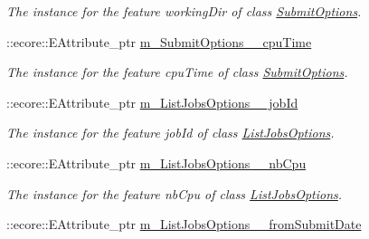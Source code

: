 \begin{DoxyCompactItemize}
\begin{DoxyCompactList}\small\item\em The instance for the feature workingDir of class \hyperlink{classTMS__Data_1_1SubmitOptions}{SubmitOptions}. \item\end{DoxyCompactList}\item 
\hypertarget{classTMS__Data_1_1TMS__DataPackage_a0ea9652678dbff3091b737de719a0cf8}{
::ecore::EAttribute\_\-ptr \hyperlink{classTMS__Data_1_1TMS__DataPackage_a0ea9652678dbff3091b737de719a0cf8}{m\_\-SubmitOptions\_\-\_\-cpuTime}}
\label{classTMS__Data_1_1TMS__DataPackage_a0ea9652678dbff3091b737de719a0cf8}

\begin{DoxyCompactList}\small\item\em The instance for the feature cpuTime of class \hyperlink{classTMS__Data_1_1SubmitOptions}{SubmitOptions}. \item\end{DoxyCompactList}\item 
\hypertarget{classTMS__Data_1_1TMS__DataPackage_a7caadfe0ba43ba0679f4a64ebd62f077}{
::ecore::EAttribute\_\-ptr \hyperlink{classTMS__Data_1_1TMS__DataPackage_a7caadfe0ba43ba0679f4a64ebd62f077}{m\_\-ListJobsOptions\_\-\_\-jobId}}
\label{classTMS__Data_1_1TMS__DataPackage_a7caadfe0ba43ba0679f4a64ebd62f077}

\begin{DoxyCompactList}\small\item\em The instance for the feature jobId of class \hyperlink{classTMS__Data_1_1ListJobsOptions}{ListJobsOptions}. \item\end{DoxyCompactList}\item 
\hypertarget{classTMS__Data_1_1TMS__DataPackage_afdd95c097e7715e96800eacca43fc3a5}{
::ecore::EAttribute\_\-ptr \hyperlink{classTMS__Data_1_1TMS__DataPackage_afdd95c097e7715e96800eacca43fc3a5}{m\_\-ListJobsOptions\_\-\_\-nbCpu}}
\label{classTMS__Data_1_1TMS__DataPackage_afdd95c097e7715e96800eacca43fc3a5}

\begin{DoxyCompactList}\small\item\em The instance for the feature nbCpu of class \hyperlink{classTMS__Data_1_1ListJobsOptions}{ListJobsOptions}. \item\end{DoxyCompactList}\item 
\hypertarget{classTMS__Data_1_1TMS__DataPackage_a6b1bf111c5e38b50f5f8b8fe9f483056}{
::ecore::EAttribute\_\-ptr \hyperlink{classTMS__Data_1_1TMS__DataPackage_a6b1bf111c5e38b50f5f8b8fe9f483056}{m\_\-ListJobsOptions\_\-\_\-fromSubmitDate}}
\label{classTMS__Data_1_1TMS__DataPackage_a6b1bf111c5e38b50f5f8b8fe9f483056}


\end{DoxyCompactItemize}
